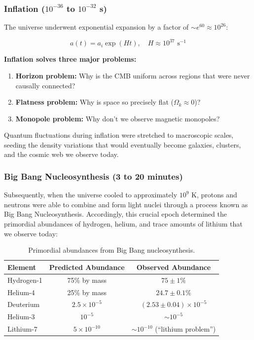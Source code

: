 \documentclass[11pt,a4paper]{article}
\begin{document}
\subsubsection{Inflation ($10^{-36}$ to $10^{-32}$ s)}

The universe underwent exponential expansion by a factor of $\sim e^{60} \approx 10^{26}$:

\begin{equationbox}
\begin{equation}
a(t) = a_i \exp(Ht), \quad H \approx 10^{37} \text{ s}^{-1}
\end{equation}
\end{equationbox}

\textbf{Inflation solves three major problems:}

\begin{enumerate}[noitemsep]
    \item \textbf{Horizon problem:} Why is the CMB uniform across regions that were never causally connected?
    \item \textbf{Flatness problem:} Why is space so precisely flat ($\Omega_k \approx 0$)?
    \item \textbf{Monopole problem:} Why don't we observe magnetic monopoles?
\end{enumerate}

Quantum fluctuations during inflation were stretched to macroscopic scales, seeding the density variations that would eventually become galaxies, clusters, and the cosmic web we observe today.

\subsubsection{Big Bang Nucleosynthesis (3 to 20 minutes)}

Subsequently, when the universe cooled to approximately $10^9$ K, protons and neutrons were able to combine and form light nuclei through a process known as Big Bang Nucleosynthesis. Accordingly, this crucial epoch determined the primordial abundances of hydrogen, helium, and trace amounts of lithium that we observe today:

\begin{table}[H]
\centering
\caption{Primordial abundances from Big Bang nucleosynthesis.}
\label{tab:bbn}
\begin{tabular}{|l|c|c|}
\hline
\textbf{Element} & \textbf{Predicted Abundance} & \textbf{Observed Abundance} \\
\hline
Hydrogen-1 & 75\% by mass & $75 \pm 1$\% \\
Helium-4 & 25\% by mass & $24.7 \pm 0.1$\% \\
Deuterium & $2.5 \times 10^{-5}$ & $(2.53 \pm 0.04) \times 10^{-5}$ \\
Helium-3 & $10^{-5}$ & $\sim 10^{-5}$ \\
Lithium-7 & $5 \times 10^{-10}$ & $\sim 10^{-10}$ (``lithium problem'') \\
\hline
\end{tabular}
\end{table}
\end{document}
